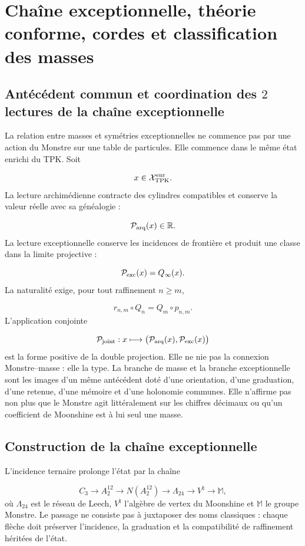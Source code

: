 \section{Chaîne exceptionnelle, théorie conforme, cordes et classification des masses}
\subsection{Antécédent commun et coordination des \(2\) lectures de la chaîne exceptionnelle}
La relation entre masses et symétries exceptionnelles ne commence pas par une action du Monstre sur une table de particules. Elle commence dans le même état enrichi du TPK. Soit

\[
x\in\mathcal X_{\rm TPK}^{\rm enr}.
\]
La lecture archimédienne contracte des cylindres compatibles et conserve la valeur réelle avec sa généalogie :

\[
\mathcal P_{\rm arq}(x)\in\mathbb R.
\]
La lecture exceptionnelle conserve les incidences de frontière et produit une classe dans la limite projective :

\[
\mathcal P_{\rm exc}(x)=Q_\infty(x).
\]
La naturalité exige, pour tout raffinement \(n\ge m\),

\[
r_{n,m}\circ Q_n=Q_m\circ p_{n,m}.
\]
L’application conjointe

\[
\mathcal P_{\rm joint}:x\longmapsto
\bigl(\mathcal P_{\rm arq}(x),\mathcal P_{\rm exc}(x)\bigr)
\]
est la forme positive de la double projection. Elle ne nie pas la connexion Monstre--masse : elle la type. La branche de masse et la branche exceptionnelle sont les images d’un même antécédent doté d’une orientation, d’une graduation, d’une retenue, d’une mémoire et d’une holonomie communes. Elle n’affirme pas non plus que le Monstre agit littéralement sur les chiffres décimaux ou qu’un coefficient de Moonshine est à lui seul une masse.

\subsection{Construction de la chaîne exceptionnelle}
L’incidence ternaire prolonge l’état par la chaîne

\[
C_3
\longrightarrow A_2^{12}
\longrightarrow N(A_2^{12})
\longrightarrow \Lambda_{24}
\longrightarrow V^\natural
\longrightarrow \mathbb M,
\]
où \(\Lambda_{24}\) est le réseau de Leech, \(V^\natural\) l’algèbre de vertex du Moonshine et \(\mathbb M\) le groupe Monstre. Le passage ne consiste pas à juxtaposer des noms classiques : chaque flèche doit préserver l’incidence, la graduation et la compatibilité de raffinement héritées de l’état.

